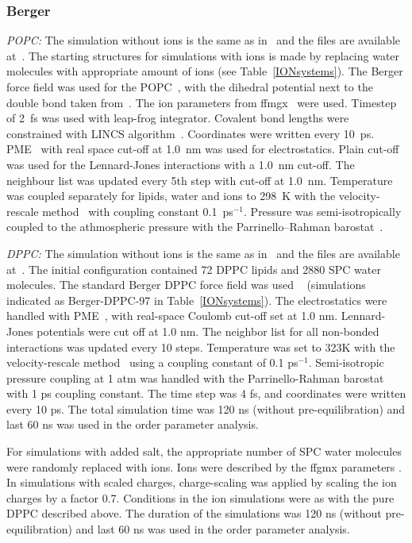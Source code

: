 \documentclass[twoside,twocolumn,9pt]{article}
\begin{document}
\subsubsection{Berger}
{\it POPC:} The simulation without ions is the same as in~\cite{ferreira13} and the files are available at~\cite{bergerFILESpopc}. 
The starting structures for simulations with ions is made by replacing water molecules with appropriate amount of ions (see Table~\ref{IONsystems}).
The Berger force field was used for the POPC~\cite{berger97}, with the dihedral potential next to the double bond 
taken from~\cite{bachar04}. The ion parameters from ffmgx~\cite{straatsma88} were used.
Timestep of 2~fs was used with leap-frog integrator. Covalent bond lengths were constrained with LINCS algorithm~\cite{hess97,hess07}. 
Coordinates were written every 10~ps. PME~\cite{darden93,essman95} with real space cut-off at 1.0~nm was used 
for electrostatics. Plain cut-off was used for the Lennard-Jones interactions with a 1.0~nm cut-off.
The neighbour list was updated every 5th step with cut-off at 1.0~nm. Temperature was coupled separately
for lipids, water and ions to 298~K with the velocity-rescale method~\cite{bussi07} with coupling constant 0.1~ps$^{-1}$.
Pressure was semi-isotropically coupled to the athmospheric pressure with the Parrinello--Rahman barostat~\cite{parrinello81}.

{\it DPPC:} The simulation without ions is the same as in~\cite{botan15} and the files are available at~\cite{bergerDPPCfiles}.
The initial configuration contained 72 DPPC lipids and 2880 SPC water molecules.
The standard Berger DPPC force field was used ~\cite{berger97} (simulations indicated as Berger-DPPC-97 in Table~\ref{IONsystems}). 
The electrostatics were handled with PME~\cite{darden93,essman95}, with real-space Coulomb cut-off set at 1.0 nm. Lennard-Jones potentials were cut off at 1.0 nm. The neighbor list for all non-bonded interactions was updated every 10 steps. 
Temperature was set to 323K with the velocity-rescale method~\cite{bussi07} using a coupling constant of 0.1 ps$^{-1}$.  Semi-isotropic pressure coupling at 1 atm was handled with the Parrinello-Rahman barostat~\cite{parrinello81} with 1 ps coupling constant. The time step was 4 fs, and coordinates were written every 10 ps. The total simulation time was 120 ns (without pre-equilibration) and last 60 ns was used in the order parameter analysis. 

For simulations with added salt, the appropriate number of SPC water molecules were randomly replaced with ions. Ions were described by the ffgmx parameters \cite{straatsma88}. In simulations with scaled charges, charge-scaling was applied by scaling the ion charges  by a factor 0.7. Conditions in the ion simulations were as with the pure DPPC described above. The duration of the simulations was 120 ns (without pre-equilibration) and last 60 ns was used in the order parameter analysis.
\end{document}
